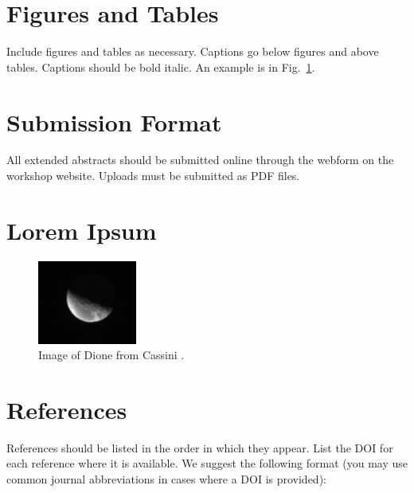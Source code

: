 \documentclass{RPI-SIW}
\begin{document}
\section*{Figures and Tables}
Include figures and tables as necessary.  Captions go below figures and above tables.  Captions should be bold italic. An example is in Fig.~\ref{figs::dione}.

\section*{Submission Format}
All extended abstracts should be submitted online through the webform on the workshop website. Uploads must be submitted as PDF files.

\section*{Lorem Ipsum}
\lipsum[1-2]

\begin{figure}[h]
	\centering
	\includegraphics[width=0.29\textwidth]{figs/Dione.png}
	\caption{Image of Dione from Cassini \cite{porco2005}.}
	\label{figs::dione}
\end{figure}

\lipsum[3-3]

\section*{References}
References should be listed in the order in which they appear. List the DOI for each reference where it is available. We suggest the following format (you may use common journal abbreviations in cases where a DOI is provided): 


\renewcommand{\refname}{}
\vspace*{-5pt}\hspace*{-10pt}
\parbox{\linewidth}{\footnotesize }
\end{document}
